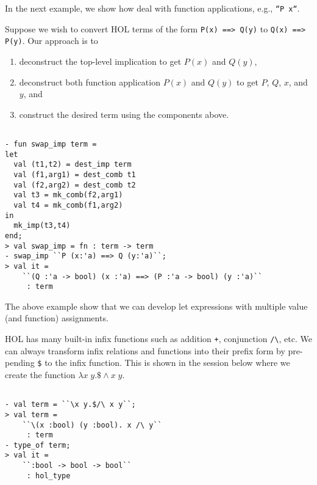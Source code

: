 In the next example, we show how deal with function applications,
e.g., \texttt{``P x``}.
\begin{example}
  Suppose we wish to convert HOL terms of the form
  \small{\verb|P(x) ==> Q(y)|} to \small{\verb|Q(x) ==> P(y)|}. Our
  approach is to
  \begin{enumerate}
  \item deconstruct the top-level implication to get $P(x)$ and $Q(y)$, 
  \item deconstruct both function application $P(x)$ and $Q(y)$ to get
    $P$, $Q$, $x$, and $y$, and
  \item construct the desired term using the components above.
  \end{enumerate}

  \begin{session}
\begin{verbatim}

- fun swap_imp term =
let
  val (t1,t2) = dest_imp term
  val (f1,arg1) = dest_comb t1
  val (f2,arg2) = dest_comb t2
  val t3 = mk_comb(f2,arg1)
  val t4 = mk_comb(f1,arg2)
in
  mk_imp(t3,t4)
end;
> val swap_imp = fn : term -> term
- swap_imp ``P (x:'a) ==> Q (y:'a)``;
> val it =
    ``(Q :'a -> bool) (x :'a) ==> (P :'a -> bool) (y :'a)``
     : term
\end{verbatim}
  \end{session}

  The above example show that we can develop let expressions with
  multiple value (and function) assignments.
\end{example}

HOL has many built-in infix functions such as addition \texttt{+},
conjunction \small{\verb|/\|}, etc.  We can always transform infix
relations and functions into their prefix form by pre-pending
\small{\verb|$|} to the infix function. This is shown in the session
below where we create the function $\lambda x\;y. \$\wedge x\;y$.
\begin{session}
\begin{verbatim}

- val term = ``\x y.$/\ x y``;
> val term =
    ``\(x :bool) (y :bool). x /\ y``
     : term
- type_of term;
> val it =
    ``:bool -> bool -> bool``
     : hol_type
\end{verbatim}
\end{session}

